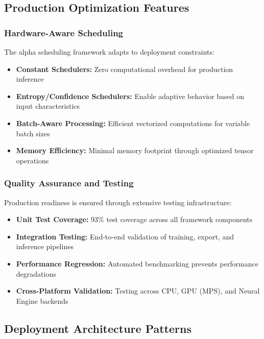 \documentclass[lettersize,journal]{IEEEtran}
\begin{document}
\subsection{Production Optimization Features}

\subsubsection{Hardware-Aware Scheduling}
The alpha scheduling framework adapts to deployment constraints:
\begin{itemize}
\item \textbf{Constant Schedulers:} Zero computational overhead for production inference
\item \textbf{Entropy/Confidence Schedulers:} Enable adaptive behavior based on input characteristics
\item \textbf{Batch-Aware Processing:} Efficient vectorized computations for variable batch sizes
\item \textbf{Memory Efficiency:} Minimal memory footprint through optimized tensor operations
\end{itemize}

\subsubsection{Quality Assurance and Testing}
Production readiness is ensured through extensive testing infrastructure:
\begin{itemize}
\item \textbf{Unit Test Coverage:} 93\% test coverage across all framework components
\item \textbf{Integration Testing:} End-to-end validation of training, export, and inference pipelines
\item \textbf{Performance Regression:} Automated benchmarking prevents performance degradations
\item \textbf{Cross-Platform Validation:} Testing across CPU, GPU (MPS), and Neural Engine backends
\end{itemize}

\subsection{Deployment Architecture Patterns}
\end{document}
